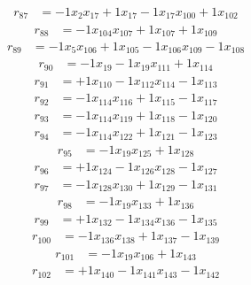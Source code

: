 \[\begin{aligned}
r_{87} &= - 1 x_{2} x_{17} + 1 x_{17} - 1 x_{17} x_{100} + 1 x_{102}
\end{aligned}\]
\[\begin{aligned}
r_{88} &= - 1 x_{104} x_{107} + 1 x_{107} + 1 x_{109}
\end{aligned}\]
\[\begin{aligned}
r_{89} &= - 1 x_{5} x_{106} + 1 x_{105} - 1 x_{106} x_{109} - 1 x_{108}
\end{aligned}\]
\[\begin{aligned}
r_{90} &= - 1 x_{19} - 1 x_{19} x_{111} + 1 x_{114}
\end{aligned}\]
\[\begin{aligned}
r_{91} &= + 1 x_{110} - 1 x_{112} x_{114} - 1 x_{113}
\end{aligned}\]
\[\begin{aligned}
r_{92} &= - 1 x_{114} x_{116} + 1 x_{115} - 1 x_{117}
\end{aligned}\]
\[\begin{aligned}
r_{93} &= - 1 x_{114} x_{119} + 1 x_{118} - 1 x_{120}
\end{aligned}\]
\[\begin{aligned}
r_{94} &= - 1 x_{114} x_{122} + 1 x_{121} - 1 x_{123}
\end{aligned}\]
\[\begin{aligned}
r_{95} &= - 1 x_{19} x_{125} + 1 x_{128}
\end{aligned}\]
\[\begin{aligned}
r_{96} &= + 1 x_{124} - 1 x_{126} x_{128} - 1 x_{127}
\end{aligned}\]
\[\begin{aligned}
r_{97} &= - 1 x_{128} x_{130} + 1 x_{129} - 1 x_{131}
\end{aligned}\]
\[\begin{aligned}
r_{98} &= - 1 x_{19} x_{133} + 1 x_{136}
\end{aligned}\]
\[\begin{aligned}
r_{99} &= + 1 x_{132} - 1 x_{134} x_{136} - 1 x_{135}
\end{aligned}\]
\[\begin{aligned}
r_{100} &= - 1 x_{136} x_{138} + 1 x_{137} - 1 x_{139}
\end{aligned}\]
\[\begin{aligned}
r_{101} &= - 1 x_{19} x_{106} + 1 x_{143}
\end{aligned}\]
\[\begin{aligned}
r_{102} &= + 1 x_{140} - 1 x_{141} x_{143} - 1 x_{142}
\end{aligned}\]
